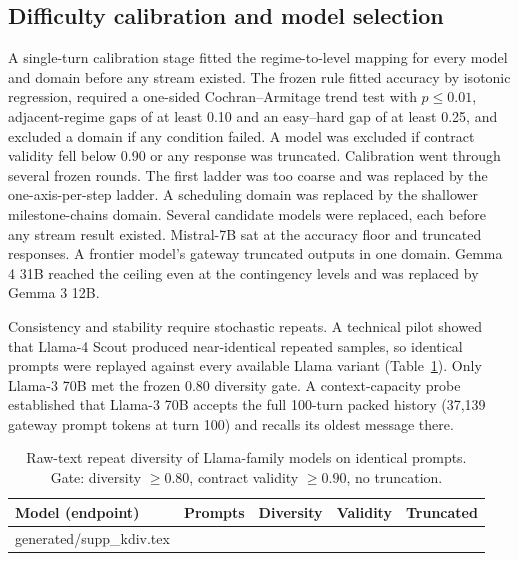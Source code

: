 \documentclass[10pt]{article}
\makeatletter
\newcommand{\inputtable}[1]{\@@input #1 }
\makeatother
\begin{document}
\subsection{Difficulty calibration and model selection}
A single-turn calibration stage fitted the regime-to-level mapping for every
model and domain before any stream existed. The frozen rule fitted accuracy by
isotonic regression, required a one-sided Cochran--Armitage trend test with
$p\le0.01$, adjacent-regime gaps of at least 0.10 and an easy--hard gap of at
least 0.25, and excluded a domain if any condition failed. A model was excluded
if contract validity fell below 0.90 or any response was truncated. Calibration
went through several frozen rounds. The first ladder was too coarse and was
replaced by the one-axis-per-step ladder. A scheduling domain was replaced by
the shallower milestone-chains domain. Several candidate models were replaced,
each before any stream result existed. Mistral-7B sat at the accuracy floor
and truncated responses. A frontier model's gateway truncated outputs in one
domain. Gemma 4 31B reached the ceiling even at the contingency levels and was
replaced by Gemma 3 12B.

Consistency and stability require stochastic repeats. A technical pilot showed
that Llama-4 Scout produced near-identical repeated samples, so identical
prompts were replayed against every available Llama variant
(Table~\ref{tab:kdiv}). Only Llama-3 70B met the frozen 0.80 diversity gate. A
context-capacity probe established that Llama-3 70B accepts the full 100-turn
packed history (37,139 gateway prompt tokens at turn 100) and recalls its
oldest message there.

\begin{table}[h]\centering\small
\caption{Raw-text repeat diversity of Llama-family models on identical prompts.
Gate: diversity $\ge0.80$, contract validity $\ge0.90$, no truncation.}
\label{tab:kdiv}
\begin{tabular}{llccc}\toprule
Model (endpoint) & Prompts & Diversity & Validity & Truncated\\\midrule
\inputtable{generated/supp_kdiv.tex}
\bottomrule\end{tabular}\end{table}
\end{document}
